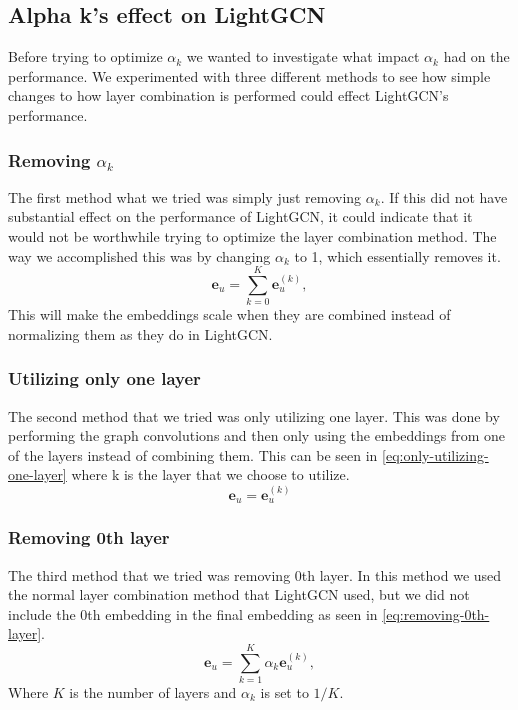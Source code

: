 \subsection{Alpha k's effect on LightGCN}\label{sec:method:alpha-k-effect}
Before trying to optimize $\alpha_k$ we wanted to investigate what impact $\alpha_k$ had on the performance.
We experimented with three different methods to see how simple changes to how layer combination is performed could effect LightGCN's performance.

\subsubsection{Removing $\alpha_k$}
The first method what we tried was simply just removing $\alpha_k$.
If this did not have substantial effect on the performance of LightGCN, it could indicate that it would not be worthwhile trying to optimize the layer combination method.
The way we accomplished this was by changing $\alpha_k$ to 1, which essentially removes it.
\begin{equation}
    \mathbf{e}_u = \sum_{k=0}^{K} \mathbf{e}_u^{(k)},
    \label{eq:removing-alpha-k-lightgcn-sum}
\end{equation}
This will make the embeddings scale when they are combined instead of normalizing them as they do in LightGCN.

\subsubsection{Utilizing only one layer}
The second method that we tried was only utilizing one layer.
This was done by performing the graph convolutions and then only using the embeddings from one of the layers instead of combining them.
This can be seen in \autoref{eq:only-utilizing-one-layer} where k is the layer that we choose to utilize. 
\begin{equation}
	\mathbf{e}_u = \mathbf{e}_u^{(k)}
	\label{eq:only-utilizing-one-layer}
\end{equation}

\subsubsection{Removing 0th layer}
The third method that we tried was removing 0th layer.
In this method we used the normal layer combination method that LightGCN used, but we did not include the 0th embedding in the final embedding as seen in \autoref{eq:removing-0th-layer}.
\begin{equation}
	\mathbf{e}_u = \sum_{k=1}^{K} \alpha_k \mathbf{e}_u^{(k)},
	\label{eq:removing-0th-layer}
\end{equation}
Where $K$ is the number of layers and $\alpha_k$ is set to $1/K$.
